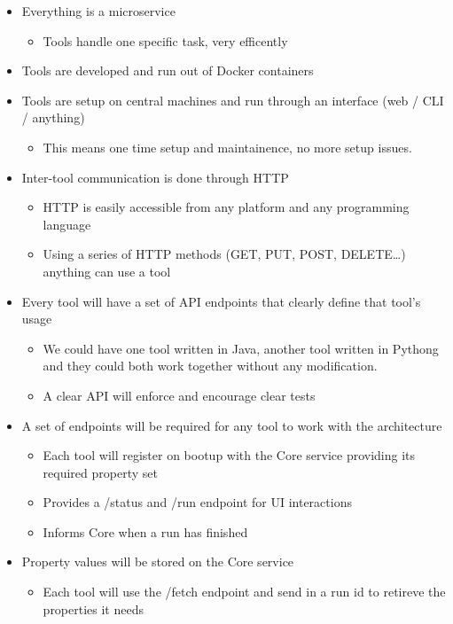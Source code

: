 \documentclass[12pt]{article}
\begin{document}
\begin{itemize}
\item
  Everything is a microservice

  \begin{itemize}
  \tightlist
  \item
    Tools handle one specific task, very efficently
  \end{itemize}
\item
  Tools are developed and run out of Docker containers
\item
  Tools are setup on central machines and run through an interface (web
  / CLI / anything)

  \begin{itemize}
  \tightlist
  \item
    This means one time setup and maintainence, no more setup issues.
  \end{itemize}
\item
  Inter-tool communication is done through HTTP

  \begin{itemize}
  \item
    HTTP is easily accessible from any platform and any programming
    language
  \item
    Using a series of HTTP methods (GET, PUT, POST, DELETE\ldots{})
    anything can use a tool
  \end{itemize}
\item
  Every tool will have a set of API endpoints that clearly define that
  tool's usage

  \begin{itemize}
  \item
    We could have one tool written in Java, another tool written in
    Pythong and they could both work together without any modification.
  \item
    A clear API will enforce and encourage clear tests
  \end{itemize}
\item
  A set of endpoints will be required for any tool to work with the
  architecture

  \begin{itemize}
  \item
    Each tool will register on bootup with the Core service providing
    its required property set
  \item
    Provides a /status and /run endpoint for UI interactions
  \item
    Informs Core when a run has finished
  \end{itemize}
\item
  Property values will be stored on the Core service

  \begin{itemize}
  \tightlist
  \item
    Each tool will use the /fetch endpoint and send in a run id to
    retireve the properties it needs
  \end{itemize}
\end{itemize}
\end{document}
